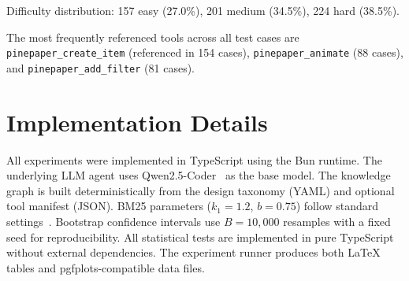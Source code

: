 \documentclass[11pt,a4paper]{article}
\begin{document}
Difficulty distribution: 157 easy (27.0\%), 201 medium (34.5\%), 224 hard (38.5\%).

The most frequently referenced tools across all test cases are \texttt{pinepaper\_create\_item} (referenced in 154 cases), \texttt{pinepaper\_animate} (88 cases), and \texttt{pinepaper\_add\_filter} (81 cases).

\section{Implementation Details}
\label{app:implementation}

All experiments were implemented in TypeScript using the Bun runtime. The underlying LLM agent uses Qwen2.5-Coder~\citep{qwen2coder2024} as the base model. The knowledge graph is built deterministically from the design taxonomy (YAML) and optional tool manifest (JSON). BM25 parameters ($k_1=1.2$, $b=0.75$) follow standard settings~\citep{robertson2009bm25}. Bootstrap confidence intervals use $B=10{,}000$ resamples with a fixed seed for reproducibility. All statistical tests are implemented in pure TypeScript without external dependencies. The experiment runner produces both LaTeX tables and pgfplots-compatible data files.
\end{document}
